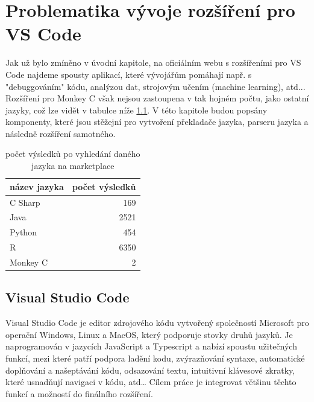 \chapter{Problematika vývoje rozšíření pro VS Code}

Jak už bylo zmíněno v úvodní kapitole, na oficiálním webu s rozšířeními pro VS Code \cite{marketplace} najdeme spousty aplikací, které vývojářům pomáhají např. s "debuggováním" kódu, analýzou dat, strojovým učením (machine learning), atd... Rozšíření pro Monkey C však nejsou zastoupena v tak hojném počtu, jako ostatní jazyky, což lze vidět v tabulce níže \ref{tab:table}. V této kapitole budou popsány komponenty, které jsou stěžejní pro vytvoření překladače jazyka, parseru jazyka a následně rozšíření samotného.\\

\begin{table}
	\centering
	\caption[]{počet výsledků po vyhledání daného jazyka na marketplace \cite{marketplace}}
	\label{tab:table}
	\begin{tabular}{lr}
			\toprule
			název jazyka & počet výsledků\\
			\midrule
			C Sharp & 169 \\
			Java & 2521 \\
			Python & 454 \\
			R & 6350 \\
			Monkey C & 2 \\
			\bottomrule
	\end{tabular}
\end{table}

\section{Visual Studio Code}
Visual Studio Code \cite{VSCODE_2020} je editor zdrojového kódu vytvořený společností Microsoft pro operační Windows, Linux a MacOS, který podporuje stovky druhů jazyků. Je naprogramován v jazycích JavaScript a Typescript a nabízí spoustu užitečných funkcí, mezi které patří podpora ladění kodu, zvýrazňování syntaxe, automatické doplňování a našeptávání kódu, odsazování textu, intuitivní klávesové zkratky, které usnadňují navigaci v kódu, atd… Cílem práce je integrovat většinu těchto funkcí a možností do finálního rozšíření.

